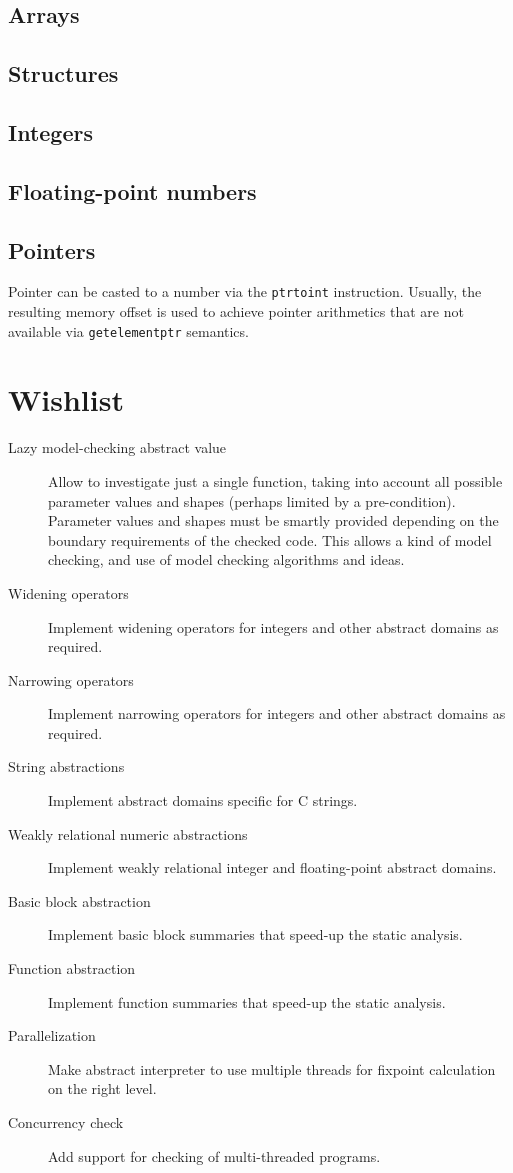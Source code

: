 \documentclass{article}
\begin{document}
\subsection{Arrays}

\subsection{Structures}

\subsection{Integers}

\subsection{Floating-point numbers}

\subsection{Pointers}
Pointer can be casted to a number via the \texttt{ptrtoint}
instruction.  Usually, the resulting memory offset is used to achieve
pointer arithmetics that are not available via \texttt{getelementptr}
semantics.

\section{Wishlist}
\begin{description}
\item[Lazy model-checking abstract value] Allow to investigate just a
  single function, taking into account all possible parameter values
  and shapes (perhaps limited by a pre-condition).  Parameter values
  and shapes must be smartly provided depending on the boundary
  requirements of the checked code.  This allows a kind of model
  checking, and use of model checking algorithms and ideas.
\item[Widening operators] Implement widening operators for integers
  and other abstract domains as required.
\item[Narrowing operators] Implement narrowing operators for integers
  and other abstract domains as required.
\item[String abstractions] Implement abstract domains specific for C
  strings.
\item[Weakly relational numeric abstractions] Implement weakly
  relational integer and floating-point abstract domains.
\item[Basic block abstraction] Implement basic block summaries that
  speed-up the static analysis.
\item[Function abstraction] Implement function summaries that speed-up
  the static analysis.
\item[Parallelization] Make abstract interpreter to use multiple
  threads for fixpoint calculation on the right level.
\item[Concurrency check] Add support for checking of multi-threaded
  programs.
\end{description}

\cleardoublepage
\begin{thebibliography}{9}

\end{thebibliography}
\end{document}

